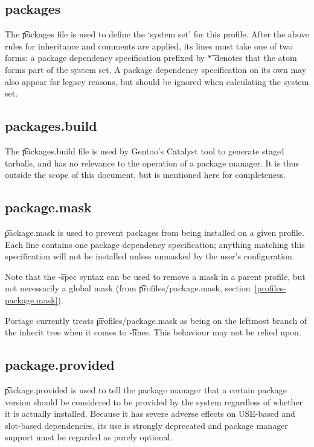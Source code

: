 \subsection{packages}
The \t{packages} file is used to define the `system set' for this profile.
After the above rules for inheritance and comments are applied, its lines must take one of two
forms: a package dependency specification prefixed by \t{*} denotes that the atom forms part of the
system set. A package dependency specification on its own may also appear for legacy reasons, but
should be ignored when calculating the system set.

\subsection{packages.build}
The \t{packages.build} file is used by Gentoo's Catalyst tool to generate stage1 tarballs, and has
no relevance to the operation of a package manager. It is thus outside the scope of this document,
but is mentioned here for completeness.

\subsection{package.mask}
\t{package.mask} is used to prevent packages from being installed on a given profile. Each line
contains one package dependency specification; anything matching this specification will not be
installed unless unmasked by the user's configuration.

Note that the \t{-spec} syntax can be used to remove a mask in a parent profile, but not
necessarily a global mask (from \t{profiles/package.mask}, section~\ref{profiles-package.mask}).

\note Portage currently treats \t{profiles/package.mask} as being on the leftmost branch of the
    inherit tree when it comes to \t{-lines}. This behaviour may not be relied upon.

\subsection{package.provided}
\t{package.provided} is used to tell the package manager that a certain package version should be
considered to be provided by the system regardless of whether it is actually installed. Because it
has severe adverse effects on USE-based and slot-based dependencies, its use is strongly deprecated
and package manager support must be regarded as purely optional.

